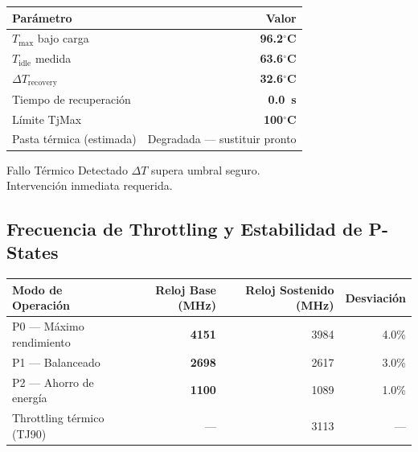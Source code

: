 \documentclass[11pt, a4paper, final]{article}
\newcommand{\mv}[1]{\textcolor{AMPrimary}{\textbf{#1}}}
\newcommand{\rowalt}{\rowcolor{AMLight}}
\newcommand{\thcell}[1]{\color{AMPrimary}\textbf{#1}}
\begin{document}
\hfill
\begin{minipage}[t]{0.39\textwidth} %
  \vspace{0pt}
  \small
  \begin{tabularx}{\linewidth}{@{}X r@{}}
    \toprule
    \thcell{Parámetro} & \thcell{Valor} \\
    \midrule
    $T_{\max}$ bajo carga        & \mv{96.2$^\circ$C} \\
    \rowalt
    $T_{\text{idle}}$ medida     & \mv{63.6$^\circ$C} \\
    $\Delta T_{\text{recovery}}$ & \mv{32.6$^\circ$C} \\
    \rowalt
    Tiempo de recuperación       & \mv{0.0\ s} \\
    Límite TjMax                 & \mv{100$^\circ$C} \\
    \rowalt
    Pasta térmica (estimada)     & Degradada — sustituir pronto \\
    \bottomrule
  \end{tabularx}

  \vspace{0.5cm}

    \begin{amboxcrit}{Fallo Térmico Detectado}
    \scriptsize $\Delta T$ supera umbral seguro.\\
    Intervención inmediata requerida.
  \end{amboxcrit}
  \end{minipage}


\subsection{Frecuencia de Throttling y Estabilidad de P-States}

\begin{tabularx}{\linewidth}{@{} X r r r @{}}
  \toprule
  \thcell{Modo de Operación} &
  \thcell{Reloj Base (MHz)} &
  \thcell{Reloj Sostenido (MHz)} &
  \thcell{Desviación} \\
  \midrule
  P0 --- Máximo rendimiento  & \mv{4151} & 3984 & 4.0\% \\
  \rowalt
  P1 --- Balanceado          & \mv{2698} & 2617 & 3.0\% \\
  P2 --- Ahorro de energía   & \mv{1100} & 1089 & 1.0\% \\
  \rowalt
  Throttling térmico (TJ90)  & ---                    & 3113 & --- \\
  \bottomrule
\end{tabularx}
\end{document}
